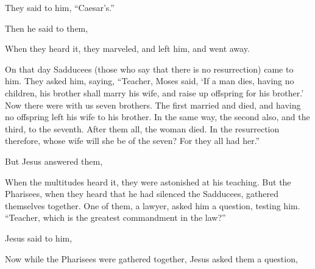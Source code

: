 {\par }{\PP {}They said to him, “Caesar’s.”
\par }{\PP Then he said to them,
{}
\par }{\PP {}When they heard it, they marveled, and left him, and went away.
\par }{\PP {}On that day Sadducees (those who say that there is no resurrection) came to him. They asked him,
saying, “Teacher, Moses said, ‘If a man dies, having no children, his brother shall marry his wife, and raise up offspring for his brother.’
Now there were with us seven brothers. The first married and died, and having no offspring left his wife to his brother.
In the same way, the second also, and the third, to the seventh.
After them all, the woman died.
In the resurrection therefore, whose wife will she be of the seven? For they all had her.”
\par }{\PP {}But Jesus answered them,
{}
{}
\par }{\PP {}When the multitudes heard it, they were astonished at his teaching.
But the Pharisees, when they heard that he had silenced the Sadducees, gathered themselves together.
One of them, a lawyer, asked him a question, testing him.
“Teacher, which is the greatest commandment in the law?”
\par }{\PP {}Jesus said to him,
{}
\par }{\PP {}Now while the Pharisees were gathered together, Jesus asked them a question,
}
